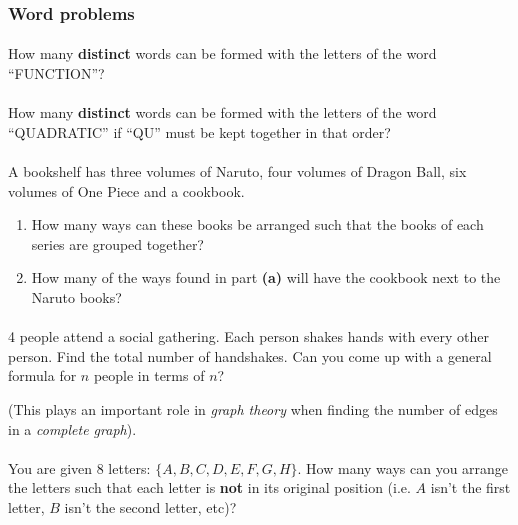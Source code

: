 \documentclass[12pt, a4paper, titlepage, twoside]{article}
\begin{document}
	\subsubsection*{Word problems}
	
	\paragraph{}
	 How many \textbf{distinct} words can be formed with the letters of the word ``FUNCTION''?
	
	\paragraph{}
	 How many \textbf{distinct} words can be formed with the letters of the word ``QUADRATIC'' if
	``QU'' must be kept together in that order?
	
	\paragraph{}
	 A bookshelf has three volumes of Naruto, four volumes of Dragon Ball, six volumes of One Piece and
	a cookbook.
	
	\begin{enumerate}[label=\textbf{(\alph*)}]
		\item How many ways can these books be arranged such that the books of each series are grouped together?
		\item How many of the ways found in part \textbf{(a)} will have the cookbook next to the Naruto books?
	\end{enumerate}
	
	\paragraph{}
	 4 people attend a social gathering. Each person shakes hands with every other person. Find the 
	total number of handshakes. Can you come up with a general formula for $n$ people in terms of $n$?
	
	(This plays an important role in \textit{graph theory} when finding the number of edges in a \textit{complete graph}).

	\paragraph{}
	 You are given 8 letters: $\{A,B,C,D,E,F,G,H\}$. How many ways can you arrange the letters such that 
	each letter is \textbf{not} in its original position (i.e. $A$ isn't the first letter, $B$ isn't the second letter, etc)?
	
\end{document}
